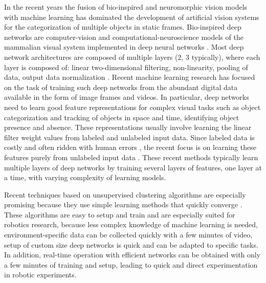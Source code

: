 \documentclass{article} %
\begin{document}
In the recent years the fusion of bio-inspired and neuromorphic vision models with machine learning has dominated the development of artificial vision systems for the categorization of multiple objects in static frames.
Bio-inspired deep networks are computer-vision and computational-neuroscience models of the mammalian visual system implemented in deep neural networks \cite{lecun_gradient-based_1998,hadsell_dimensionality_2006,gregor_structured_2011,riesenhuber_hierarchical_1999,serre_feedforward_2007,serre_neuromorphic_2010}. Most deep network architectures are composed of multiple layers (2, 3 typically), where each layer is composed of: linear two-dimensional filtering, non-linearity, pooling of data, output data normalization \cite{jarrett_what_2009,lecun_convolutional_2010,boureau_theoretical_2010}. 
Recent machine learning research has focused on the task of training such deep networks from the abundant digital data available in the form of image frames and videos. In particular, deep networks need to learn good feature representations for complex visual tasks such as object categorization and tracking of objects in space and time, identifying object presence and absence. These representations usually involve learning the linear filter weight values from labeled and unlabeled input data. Since labeled data is costly and often ridden with human errors \cite{karpathy_lessons_2011, torralba_unbiased_2011, hou_meta-theory_2012}, the recent focus is on learning these features purely from unlabeled input data \cite{olshausen_emergence_1996, hyvarinen_independent_2000, hinton_fast_2006, vincent_extracting_2008, coates_analysis_2011}. These recent methods typically learn multiple layers of deep networks by training several layers of features, one layer at a time, with varying complexity of learning models. 

Recent techniques based on unsupervised clustering algorithms are especially promising because they use simple learning methods that quickly converge \cite{coates_analysis_2011}. 
These algorithms are easy to setup and train and are especially suited for robotics research, because less complex knowledge of machine learning is needed, environment-specific data can be collected quickly with a few minutes of video, setup of custom size deep networks is quick and can be adapted to specific tasks. %
In addition, real-time operation with efficient networks can be obtained with only a few minutes of training and setup, leading to quick and direct experimentation in robotic experiments.
\end{document}
